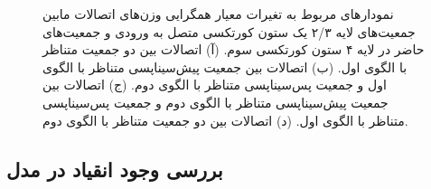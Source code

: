 \documentclass[12pt]{report}
\begin{document}
	\begin{figure}[]
		\centering
		\caption{
			نمودار‌های مربوط به تغیرات معیار همگرایی وزن‌های اتصالات مابین جمعیت‌های لایه ۲/۳ یک ستون کورتکسی متصل به ورودی و جمعیت‌های حاضر در لایه ۴ ستون کورتکسی سوم.
			(آ) اتصالات بین دو جمعیت متناظر با الگوی اول.
			(ب) اتصالات بین جمعیت پیش‌سیناپسی متناظر با الگوی اول و جمعیت پس‌سیناپسی متناظر با الگوی دوم.
			(ج) اتصالات بین جمعیت پیش‌سیناپسی متناظر با الگوی دوم و جمعیت پس‌سیناپسی متناظر با الگوی اول. 
			(د) اتصالات بین دو جمعیت متناظر با الگوی دوم.
		}
		\label{fig:convergence}
	\end{figure}
	
	\subsection{بررسی وجود انقیاد در مدل}
	
\end{document}
